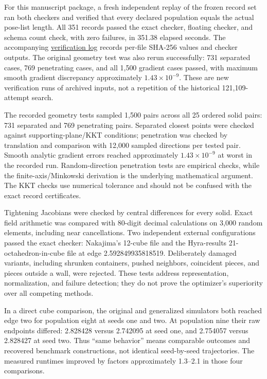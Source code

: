 \documentclass[11pt,a4paper]{article}
\begin{document}
For this manuscript package, a fresh independent replay of the frozen record set ran both checkers and verified that every declared population equals the actual pose-list length. All 351 records passed the exact checker, floating checker, and schema count check, with zero failures, in 351.38 elapsed seconds. The accompanying \href{research/verification.json}{verification log} records per-file SHA-256 values and checker outputs. The original geometry test was also rerun successfully: 731 separated cases, 769 penetrating cases, and all 1,500 gradient cases passed, with maximum smooth gradient discrepancy approximately \(1.43\times10^{-9}\). These are new verification runs of archived inputs, not a repetition of the historical 121,109-attempt search.

The recorded geometry tests sampled 1,500 pairs across all 25 ordered solid pairs: 731 separated and 769 penetrating pairs. Separated closest points were checked against supporting-plane/KKT conditions; penetration was checked by translation and comparison with 12,000 sampled directions per tested pair. Smooth analytic gradient errors reached approximately \(1.43\times10^{-9}\) at worst in the recorded run. Random-direction penetration tests are empirical checks, while the finite-axis/Minkowski derivation is the underlying mathematical argument. The KKT checks use numerical tolerance and should not be confused with the exact record certificates.

Tightening Jacobians were checked by central differences for every solid. Exact field arithmetic was compared with 80-digit decimal calculations on 3,000 random elements, including near cancellations. Two independent external configurations passed the exact checker: Nakajima's 12-cube file and the Hyra-results 21-octahedron-in-cube file at edge 2.592849935818519. Deliberately damaged variants, including shrunken containers, pushed neighbors, coincident pieces, and pieces outside a wall, were rejected. These tests address representation, normalization, and failure detection; they do not prove the optimizer's superiority over all competing methods.

In a direct cube comparison, the original and generalized simulators both reached edge two for population eight at seeds one and two. At population nine their raw endpoints differed: 2.828428 versus 2.742095 at seed one, and 2.754057 versus 2.828427 at seed two. Thus ``same behavior'' means comparable outcomes and recovered benchmark constructions, not identical seed-by-seed trajectories. The measured runtimes improved by factors approximately 1.3--2.1 in those four comparisons.
\end{document}
